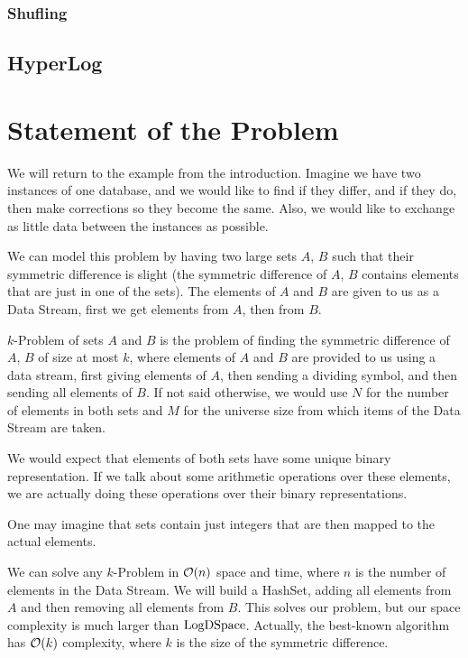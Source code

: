 \subsubsection{Shufling}

\subsection{HyperLog}


\section{Statement of the Problem}

We will return to the example from the introduction. Imagine we have two instances of one database, and we would like to find if they differ, and if they do, then make corrections so they become the same. Also, we would like to exchange as little data between the instances as possible.

We can model this problem by having two large sets \(A\), \(B\) such that their symmetric difference is slight (the symmetric difference of \(A\), \(B\) contains elements that are just in one of the sets). The elements of \(A\) and \(B\) are given to us as a Data Stream, first we get elements from \(A\), then from \(B\).

\begin{defn}
    \(k\)-Problem of sets \(A\) and \(B\) is the problem of finding the symmetric difference of \(A\), \(B\) of size at most \(k\), where elements of \(A\) and \(B\) are provided to us using a data stream, first giving elements of \(A\), then sending a dividing symbol, and then sending all elements of \(B\). If not said otherwise, we would use \(N\) for the number of elements in both sets and \(M\) for the universe size from which items of the Data Stream are taken.
\end{defn}

We would expect that elements of both sets have some unique binary representation. If we talk about some arithmetic operations over these elements, we are actually doing these operations over their binary representations.

One may imagine that sets contain just integers that are then mapped to the actual elements.

We can solve any \(k\)-Problem in \(\mathcal{O}(n)\) space and time, where \(n\) is the number of elements in the Data Stream. We will build a HashSet, adding all elements from \(A\) and then removing all elements from \(B\). This solves our problem, but our space complexity is much larger than \(\mathrm{LogDSpace}\). Actually, the best-known algorithm has \(\mathcal{O}(k)\) complexity, where \(k\) is the size of the symmetric difference.

